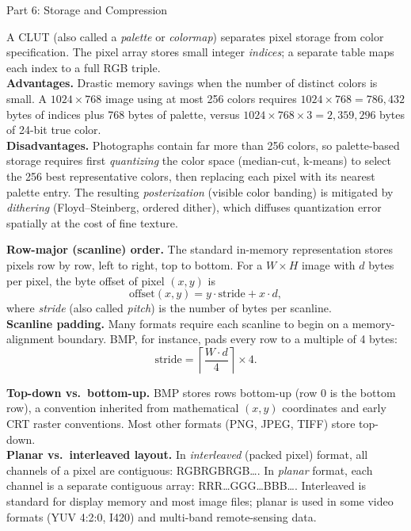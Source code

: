 \documentclass[letterpaper]{article}
\begin{document}
\begin{notes}{Part 6: Storage and Compression}

A CLUT (also called a \emph{palette} or \emph{colormap}) separates pixel storage from color specification. The pixel array stores small integer \emph{indices}; a separate table maps each index to a full RGB triple.\\

\textbf{Advantages.} Drastic memory savings when the number of distinct colors is small. A $1024\times768$ image using at most 256 colors requires $1024\times768=786{,}432$ bytes of indices plus 768 bytes of palette, versus $1024\times768\times3=2{,}359{,}296$ bytes of 24-bit true color.\\

\textbf{Disadvantages.} Photographs contain far more than 256 colors, so palette-based storage requires first \emph{quantizing} the color space (median-cut, k-means) to select the 256 best representative colors, then replacing each pixel with its nearest palette entry. The resulting \emph{posterization} (visible color banding) is mitigated by \emph{dithering} (Floyd--Steinberg, ordered dither), which diffuses quantization error spatially at the cost of fine texture.


\textbf{Row-major (scanline) order.} The standard in-memory representation stores pixels row by row, left to right, top to bottom. For a $W\times H$ image with $d$ bytes per pixel, the byte offset of pixel $(x,y)$ is
$$\text{offset}(x,y)=y\cdot\text{stride}+x\cdot d,$$
where \emph{stride} (also called \emph{pitch}) is the number of bytes per scanline.\\

\textbf{Scanline padding.} Many formats require each scanline to begin on a memory-alignment boundary. BMP, for instance, pads every row to a multiple of 4 bytes:
$$\text{stride}=\left\lceil\frac{W\cdot d}{4}\right\rceil\times 4.$$

\textbf{Top-down vs.\ bottom-up.} BMP stores rows bottom-up (row 0 is the bottom row), a convention inherited from mathematical $(x,y)$ coordinates and early CRT raster conventions. Most other formats (PNG, JPEG, TIFF) store top-down.\\

\textbf{Planar vs.\ interleaved layout.} In \emph{interleaved} (packed pixel) format, all channels of a pixel are contiguous: RGBRGBRGB\ldots. In \emph{planar} format, each channel is a separate contiguous array: RRR\ldots GGG\ldots BBB\ldots. Interleaved is standard for display memory and most image files; planar is used in some video formats (YUV 4:2:0, I420) and multi-band remote-sensing data.


\end{notes}
\end{document}
